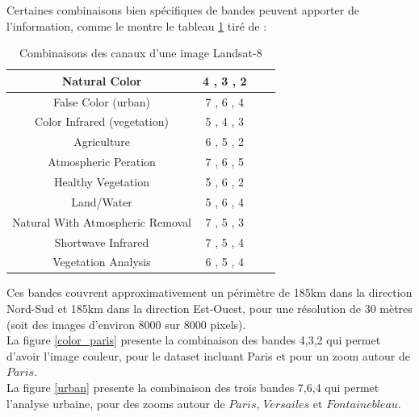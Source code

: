 \documentclass{book}
\begin{document}
\clearpage

Certaines combinaisons bien spécifiques de bandes peuvent apporter de l'information, comme le montre le tableau \ref{combinaison}
tiré de \cite{esri}:\\

\begin{table}
\begin{center}
\begin{tabular}{|c|c|c|c|}
\hline
Natural Color & 4 , 3 , 2\\
\hline
False Color (urban) & 7 , 6 , 4\\
\hline
Color Infrared (vegetation) & 5 , 4 , 3\\
\hline
Agriculture & 6 , 5 , 2\\
\hline
Atmospheric Peration & 7 , 6 , 5\\
\hline
Healthy Vegetation & 5 , 6 , 2\\
\hline
Land/Water & 5 , 6 , 4\\
\hline
Natural With Atmospheric Removal & 7 , 5 , 3\\
\hline
Shortwave Infrared & 7 , 5 , 4\\
\hline
Vegetation Analysis & 6 , 5 , 4\\
\hline
\end{tabular}
\end{center}
\caption{Combinaisons des canaux d'une image Landsat-8}
\label{combinaison}
\end{table}
\clearpage

Ces bandes couvrent approximativement un périmètre de 185km dans la direction Nord-Sud et 185km
dans la direction Est-Ouest, pour une résolution de 30 mètres (soit des images d'environ 8000 sur 8000 pixels).\\
La figure \ref{color_paris} presente la combinaison des bandes 4,3,2 qui permet d'avoir l'image couleur, pour le dataset incluant Paris et pour un zoom autour de $Paris$.\\
La figure \ref{urban} presente la combinaison des trois bandes 7,6,4 qui permet l'analyse urbaine, pour des zooms autour de $Paris$, $Versailes$ et $Fontainebleau$.\\
\end{document}

